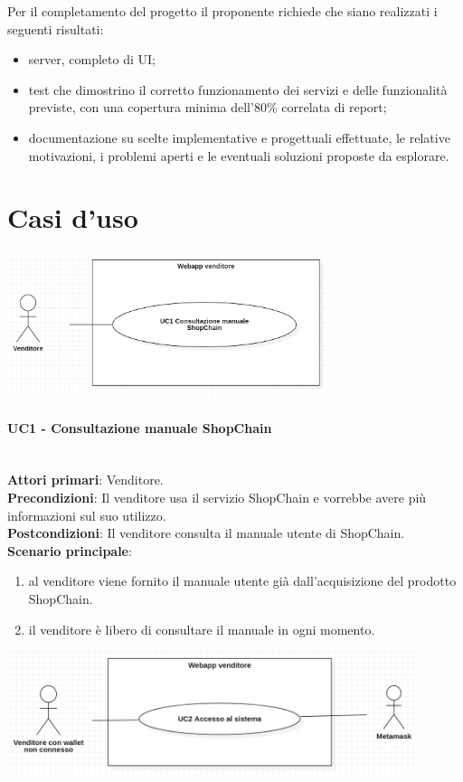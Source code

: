 \documentclass[a4paper, 12pt]{article}
\begin{document}
Per il completamento del progetto il proponente richiede che siano realizzati i seguenti risultati:
\begin{itemize}
\item server, completo di UI;
\item test che dimostrino il corretto funzionamento dei servizi e delle funzionalità previste, con una copertura minima dell'80\% correlata di report;
\item documentazione su scelte implementative e progettuali effettuate, le relative motivazioni, i problemi aperti e le eventuali soluzioni proposte da esplorare.
\end{itemize}

\section{Casi d'uso}

\includegraphics[width=0.7\textwidth]{UC_WAV1}

\paragraph{UC1 - Consultazione manuale ShopChain}\\
\textbf{Attori primari}: Venditore.\\
\textbf{Precondizioni}: Il venditore usa il servizio ShopChain e vorrebbe avere più informazioni sul suo utilizzo.\\
\textbf{Postcondizioni}: Il venditore consulta il manuale utente di ShopChain.\\
\textbf{Scenario principale}:\\
\begin{enumerate}
\item al venditore viene fornito il manuale utente già dall'acquisizione del prodotto ShopChain.
\item il venditore è libero di consultare il manuale in ogni momento.
\end{enumerate}

\includegraphics[width=0.9\textwidth]{UC_WAV2}
\end{document}
